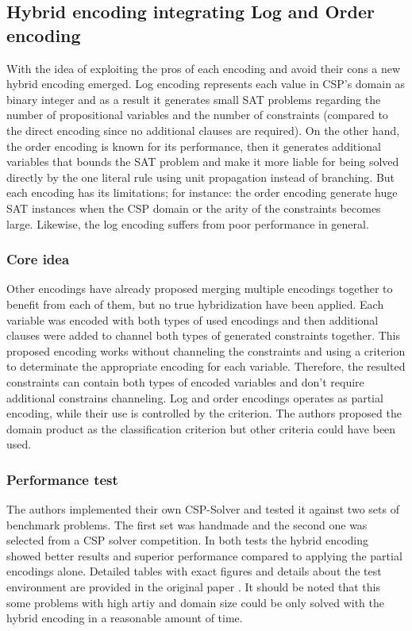 \subsection{Hybrid encoding integrating Log and Order encoding}
With the idea of exploiting the pros of each encoding and avoid their cons a new hybrid encoding emerged. Log encoding represents each value in CSP's domain as binary integer and as a result it generates small SAT problems regarding the number of propositional variables and the number of constraints (compared to the direct encoding since no additional clauses are required). On the other hand, the order encoding is known for its performance, then it generates additional variables that bounds the SAT problem and make it more liable for being solved directly by the one literal rule using unit propagation instead of branching. But each encoding has its limitations; for instance: the order encoding generate huge SAT instances when the CSP domain or the arity of the constraints becomes large. Likewise, the log encoding suffers from poor performance in general.

\subsubsection{Core idea}
Other encodings have already proposed merging multiple encodings together to benefit from each of them, but no true hybridization have been applied. Each variable was encoded with both types of used encodings and then additional clauses were added to channel both types of generated constraints together. This proposed encoding works without channeling the constraints and using a criterion to determinate the appropriate encoding for each variable. Therefore, the resulted constraints can contain both types of encoded variables and don't require additional constrains channeling. Log and order encodings operates as partial encoding, while their use is controlled by the criterion. The authors proposed the domain product as the classification criterion but other criteria could have been used. \cite{soh2015hybrid}

\subsubsection{Performance test}
The authors implemented their own CSP-Solver and tested it against two sets of benchmark problems. The first set was handmade and the second one was selected from a CSP solver competition. In both tests the hybrid encoding showed better results and superior performance compared to applying the partial encodings alone. Detailed tables with exact figures and details about the test environment are provided in the original paper \cite{soh2015hybrid}. It should be noted that this some problems with high artiy and domain size could be only solved with the hybrid encoding in a reasonable amount of time.


